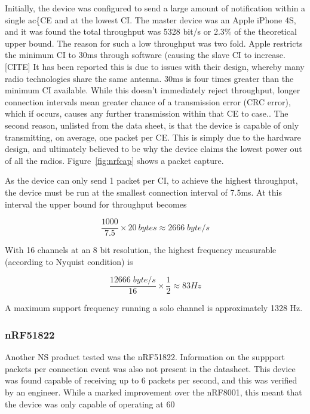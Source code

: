 \documentclass[]{article}
\begin{document}
{Initially, the device was configured to send a large amount of notification within a single ac\{CE} and at the lowest \ac{CI}. The master device was an Apple iPhone 4S, and it was found the total throughput was 5328 bit/s or 2.3\% of the theoretical upper bound. The reason for such a low throughput was two fold. Apple restricts the minimum \ac{CI} to 30ms through software (causing the slave \ac{CI} to increase. [CITE] It has been reported this is due to issues with their design, whereby many radio technologies share the same antenna. 30ms is four times greater than the minimum \ac{CI} available. While this doesn't immediately reject throughput, longer connection intervals mean greater chance of a transmission error (CRC error), which if occurs, causes any further transmission within that \ac{CE} to case.. The second reason, unlisted from the data sheet\cite{nrf8001}, is that the device is capable of only transmitting, on average, one packet per \ac{CE}. This is simply due to the hardware design, and ultimately believed to be why the device claims the lowest power out of all the radios. Figure~\ref{fig:nrfcap} shows a packet capture.



As the device can only send 1 packet per \ac{CI}, to achieve the highest throughput, the device must be run at the smallest connection interval of 7.5ms. At this interval the upper bound for throughput becomes

\begin{displaymath}
\frac{1000}{7.5} \times 20\:bytes \approx 2666\;byte/s
\end{displaymath}

With 16 channels at an 8 bit resolution, the highest frequency measurable (according to Nyquist condition) is 

\begin{displaymath}
\frac{1 2666\; byte/s}{16} \times \frac{1}{2} \approx 83  Hz
\end{displaymath}

A maximum support frequency running a solo channel is approximately 1328 Hz.

\subsubsection{nRF51822}
Another \ac{NS} product tested was the nRF51822. Information on the suppport packets per connection event was also not present in the datasheet\cite{nrf51822}. This device was found capable of receiving up to 6 packets per second, and this was verified by an engineer\cite{olme}. While a marked improvement over the nRF8001, this meant that the device was only capable of operating at 60%
\end{document}
